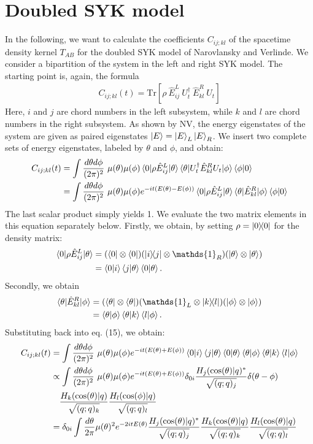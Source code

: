 \documentclass{scrarticle}
\begin{document}
\section{Doubled SYK model}
In the following, we want to calculate the coefficients $C_{ij;kl}$ of the spacetime density kernel $T_{AB}$ for the doubled SYK model of Narovlansky and Verlinde. We consider a bipartition of the system in the left and right SYK model. The starting point is, again, the formula
\begin{align}
    C_{ij; kl}(t) = \text{Tr} \left[ \rho \ \hat{E}_{ij}^L \ U_t^\dagger \ \hat{E}_{kl}^R \ U_t \right]
\end{align}
Here, $i$ and $j$ are chord numbers in the left subsystem, while $k$ and $l$ are chord numbers in the right subsystem. As shown by NV, the energy eigenstates of the system are given as paired eigenstates $\ket{E}=\ket{E}_L\ket{E}_R$. We insert two complete sets of energy eigenstates, labeled by $\theta$ and $\phi$, and obtain:
\begin{align}
    C_{ij;kl}(t) &= 
    \int \frac{d\theta d\phi}{(2\pi)^2} \ \mu(\theta) \mu(\phi) \braket{0|\rho \hat{E}_{ij}^L|\theta} \braket{\theta|U_t^\dagger\hat{E}_{kl}^RU_t|\phi}\braket{\phi|0}\\
    &= 
    \int \frac{d\theta d\phi}{(2\pi)^2} \ \mu(\theta) \mu(\phi) e^{-i t(E(\theta)-E(\phi))}\braket{0|\rho \hat{E}_{ij}^L|\theta} \braket{\theta|\hat{E}_{kl}^R|\phi}\braket{\phi|0}
\end{align}
The last scalar product simply yields 1. We evaluate the two matrix elements in this equation separately below. Firstly, we obtain, by setting $\rho=\ketbra{0}{0}$ for the density matrix:
\begin{align}
    \braket{0|\rho \hat{E}_{ij}^L|\theta}&=(\bra{0}\otimes\bra{0})(\ketbra{i}{j} \otimes  \mathds{1}_R)(\ket{\theta}\otimes\ket{\theta})\\
    &=\braket{0|i}\braket{j|\theta}\braket{0|\theta}.
\end{align}
Secondly, we obtain 
\begin{align}
    \braket{\theta|\hat{E}_{kl}^R|\phi}&=(\bra{\theta}\otimes\bra{\theta})( \mathds{1}_L\otimes \ketbra{k}{l})(\ket{\phi}\otimes\ket{\phi})\\
    &=\braket{\theta|\phi}\braket{\theta|k}\braket{l|\phi}.
\end{align}
Substituting back into eq. (15), we obtain:
\begin{align}
    C_{ij;kl}(t) &= \int \frac{d\theta d\phi}{(2\pi)^2} \ \mu(\theta) \mu(\phi) e^{-i t(E(\theta)+E(\phi))}\braket{0|i}\braket{j|\theta}\braket{0|\theta}\braket{\theta|\phi}\braket{\theta|k}\braket{l|\phi}\\
    &\propto\int \frac{d\theta d\phi}{(2\pi)^2} \ \mu(\theta) \mu(\phi) e^{-i t(E(\theta)+E(\phi))}\delta_{0i}\frac{H_j(\cos(\theta)|q)^*}{\sqrt{(q; q)_j}}\delta(\theta-\phi)\\
    &\quad\frac{H_k(\cos(\theta)|q)}{\sqrt{(q; q)_k}}\frac{H_l(\cos(\phi)|q)}{\sqrt{(q; q)_l}}\\
    &=\delta_{0i}\int \frac{d\theta}{2\pi}\mu(\theta)^2e^{-2i tE(\theta)}\frac{H_j(\cos(\theta)|q)^*}{\sqrt{(q; q)_j}}\frac{H_k(\cos(\theta)|q)}{\sqrt{(q;q)_k}} \frac{H_l(\cos(\theta)|q)}{\sqrt{(q; q)_l}}
\end{align}
\end{document}

